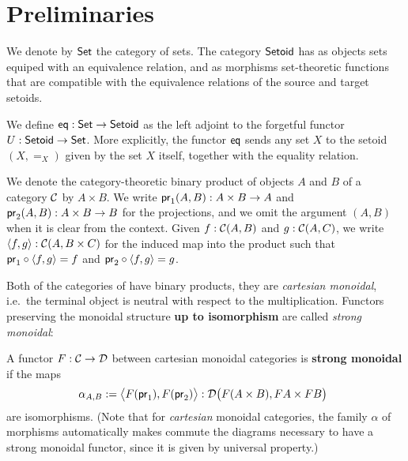 \documentclass{amsart}
\newcommand{\fat}[1]{\textbf{#1}}
\begin{document}
\section{Preliminaries}\label{sec:preliminaries}


\begin{definition}\label{def:set_setoid}
 We denote by $\Set$ the category of sets. The category $\Setoid$ has as objects sets equiped with an equivalence relation,
 and as morphisms set-theoretic functions that are compatible with the equivalence relations of the source and target setoids.
\end{definition}



\begin{definition}\label{def:eq}
 We define $\eq : \Set\to\Setoid$ as the left adjoint to the forgetful functor 
  $U : \Setoid \to \Set$.
  More explicitly, the functor $\eq$ sends any set $X$ to the setoid $(X,=_X)$ given by the set $X$ itself, together
  with the equality relation.
\end{definition}


\begin{remark}
  We denote the category-theoretic binary product of objects $A$ and $B$ of a category $\C$ by $A\times B$.
  We write $\pr_1(A,B) : A\times B \to A$ and $\pr_2(A,B) : A\times B \to B$ for the projections, and we omit the 
  argument $(A,B)$ when it is clear from the context.
  Given $f : \C(A, B)$ and $g : \C(A,C)$, we write $\langle f,g\rangle : \C(A,B\times C)$ for the induced map into the product such that
  $\comp{\langle f,g\rangle}{\pr_1} = f$ and $\comp{\langle f,g\rangle}{\pr_2} = g$.
\end{remark}

Both of the categories of  have binary products, they are \emph{cartesian monoidal}, i.e.\ the terminal 
object is neutral with respect to the multiplication. Functors preserving the monoidal structure \textbf{up to isomorphism}
are called \emph{strong monoidal}:

\begin{definition}\label{def:monoidal_functor}
 A functor $F:\C\to\D$ between cartesian monoidal categories is \fat{strong monoidal} if the maps
 \[ \alpha_{A,B} := \bigl\langle F(\pr_1), F(\pr_2) \bigr\rangle : \D\bigl(F(A\times B), FA\times FB\bigr)\enspace  \] 
 are isomorphisms.
 (Note that for \emph{cartesian} monoidal categories, the family $\alpha$ of morphisms automatically makes commute the 
  diagrams necessary to have a strong monoidal functor, since it is given by universal property.)
\end{definition}
\end{document}

